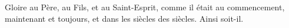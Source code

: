 Gloire au Père, au Fils, et au Saint-Esprit,
comme il était au commencement, maintenant et toujours, et dans les siècles des siècles.
Ainsi soit-il.